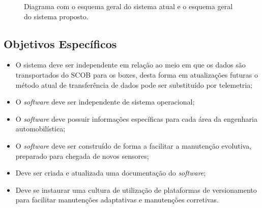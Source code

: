 \begin{figure}[!htb]
	\center
	\caption{Diagrama com o esquema geral do sistema atual e o esquema geral do sistema proposto.}
	\qquad
	\label{fig:esquemageral}
\end{figure}


\subsection{Objetivos Específicos} 

\begin{itemize}[label={-}]
	\item O sistema deve ser independente em relação ao meio em que os dados são transportados do SCOB para os boxes, desta forma em atualizações futuras o método atual de transferência de dados pode ser substituído por telemetria;
	\item O \textit{software} deve ser independente de sistema operacional;
	\item O \textit{software} deve possuir informações específicas para cada área da engenharia automobilística;
	\item O \textit{software} deve ser construído de forma a facilitar a manutenção evolutiva, preparado para chegada de novos sensores;
	\item Deve ser criada e atualizada uma documentação do \textit{software};
	\item Deve se instaurar uma cultura de utilização de plataformas de versionamento para facilitar manutenções adaptativas e manutenções corretivas.
\end{itemize}

